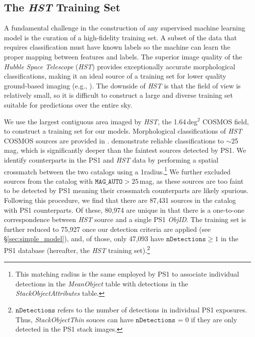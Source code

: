\documentclass[twocolumn, dvipdfmx]{aastex62}
\begin{document}
\subsection{The \textit{HST} Training Set} \label{sec:hst_train}

A fundamental challenge in the construction of any supervised machine learning
model is the curation of a high-fidelity training set. A subset of the data
that requires classification must have known labels so the machine can learn
the proper mapping between features and labels. The superior image quality of
the \textit{Hubble Space Telescope} (\textit{HST}) provides exceptionally
accurate morphological classifications, making it an ideal source of a training
set for lower quality ground-based imaging (e.g., \citealt{Lupton01}). The
downside of \textit{HST} is that the field of view is relatively small, so it
is difficult to construct a large and diverse training set suitable for
predictions over the entire sky.

We use the largest contiguous area imaged by \textit{HST}, the 1.64\,deg$^2$
COSMOS field, to construct a training set for our models. Morphological
classifications of \textit{HST} COSMOS sources are provided in
\citet{Leauthaud07}. \citeauthor{Leauthaud07} demonstrate reliable
classifications to $\sim$25\,mag, which is significantly deeper than the
faintest sources detected by PS1. We identify counterparts in the PS1 and
\textit{HST} data by performing a spatial crossmatch between the two catalogs
using a 1\arcsec radius.\footnote{This matching radius is the same employed
by PS1 to associate individual detections in the \textit{MeanObject} table
with detections in the \textit{StackObjectAttributes} table.} We further
excluded sources from the \citet{Leauthaud07} catalog with
$\texttt{MAG\_AUTO} > 25$\,mag, as these sources are too faint to be detected
by PS1 meaning their crossmatch counterparts are likely spurious. Following
this procedure, we find that there are 87,431 sources in the
\citet{Leauthaud07} catalog with PS1 counterparts. Of these, 80,974 are
unique in that there is a one-to-one correspondence between \textit{HST}
source and a single PS1 \textit{ObjID}. The training set is further reduced
to 75,927 once our detection criteria are applied (see
\S\ref{sec:simple_model}), and, of those, only 47,093 have
$\texttt{nDetections} \ge 1$ in the PS1 database (hereafter, the \textit{HST}
training set).\footnote{$\texttt{nDetections}$ refers to the number of
detections in individual PS1 exposures. Thus, \textit{StackObjectThin} souces
can have $\texttt{nDetections}$ = 0 if they are only detected in the PS1
stack images.}
\end{document}
